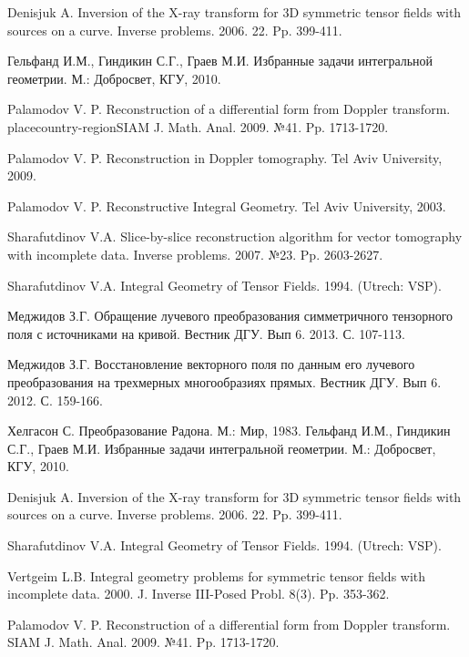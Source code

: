 \begin{thebibliography}{1}
 Denisjuk A. Inversion of the X-ray transform for 3D symmetric tensor fields with sources on a curve. Inverse problems. 2006. 22. Pp. 399-411.

  Гельфанд И.М., Гиндикин С.Г., Граев М.И. Избранные задачи интегральной геометрии. М.: Добросвет, КГУ, 2010.

  Palamodov V. P. Reconstruction of a differential form from Doppler transform. placecountry-regionSIAM J. Math. Anal. 2009. №41. Pp. 1713-1720.

  Palamodov V. P. Reconstruction in Doppler tomography. Tel Aviv University, 2009.

  Palamodov V. P. Reconstructive Integral Geometry. Tel Aviv University, 2003.

  Sharafutdinov V.A. Slice-by-slice reconstruction algorithm for vector tomography with incomplete data. Inverse problems. 2007. №23. Pp. 2603-2627.

  Sharafutdinov V.A. Integral Geometry of Tensor Fields. 1994. (Utrech: VSP).

  Меджидов З.Г. Обращение лучевого преобразования симметричного тензорного поля с источниками на кривой. Вестник ДГУ. Вып 6. 2013. С. 107-113.

  Меджидов З.Г. Восстановление векторного поля по данным его лучевого преобразования на трехмерных многообразиях прямых. Вестник ДГУ. Вып 6. 2012. С. 159-166.

  Хелгасон С. Преобразование Радона. М.: Мир, 1983.
  Гельфанд И.М., Гиндикин С.Г., Граев М.И. Избранные задачи интегральной геометрии. М.: Добросвет, КГУ, 2010.

  Denisjuk A. Inversion of the X-ray transform for 3D symmetric tensor fields with sources on a curve. Inverse problems. 2006. 22. Pp. 399-411.

  Sharafutdinov V.A. Integral Geometry of Tensor Fields. 1994. (Utrech: VSP).

  Vertgeim L.B. Integral geometry problems for symmetric tensor fields with incomplete data. 2000. J. Inverse III-Posed Probl. 8(3). Pp. 353-362.

  Palamodov V. P. Reconstruction of a differential form from Doppler transform. SIAM J. Math. Anal. 2009. №41. Pp. 1713-1720.


\end{thebibliography}
